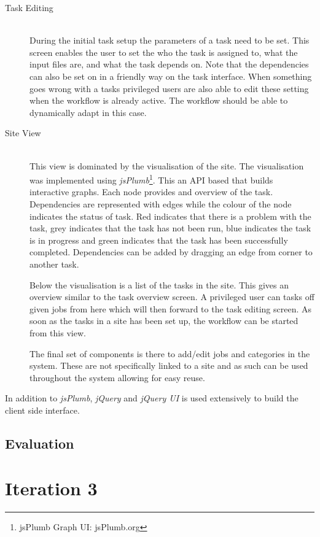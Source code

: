 \documentclass[12pt,a4paper]{report}
\begin{document}
\begin{description}
\item[Task Editing] \hfill \\
    During the initial task setup the parameters of a task need to be set. This screen enables
    the user to set the who the task is assigned to, what the input files are, and what the task
    depends on. Note that the dependencies can also be set on in a friendly way on the task interface.
    When something goes wrong with a tasks privileged users are also able to edit these setting
    when the workflow is already active. The workflow should be able to dynamically adapt in this case.
\item[Site View] \hfill \\
    This view is dominated by the visualisation of the site. The visualisation was implemented using
    \emph{jsPlumb}\footnote{jsPlumb Graph UI: jsPlumb.org}. This an API based that builds interactive
    graphs. Each node provides and overview of the task. Dependencies are represented with edges
    while the colour of the node indicates the status of task. Red indicates that there is a
    problem with the task, grey indicates that the task has not been run, blue indicates the
    task is in progress and green indicates that the task has been successfully completed. Dependencies
    can be added by dragging an edge from corner to another task.

    Below the visualisation is a list of the tasks in the site. This gives an overview
    similar to the task overview screen. A privileged user can tasks off given jobs
    from here which will then forward to the task editing screen.
    As soon as the tasks in a site has been set up, the workflow can be started from this view.

    The final set of components is there to add/edit jobs and categories in the system. These
    are not specifically linked to a site and as such can be used throughout the system allowing
    for easy reuse.
\end{description}
In addition to \emph{jsPlumb}, \emph{jQuery} and \emph{jQuery UI} is used extensively to build
the client side interface.
\subsection{Evaluation}




\section{Iteration 3\label{iteration3}}


{}

\end{document}
